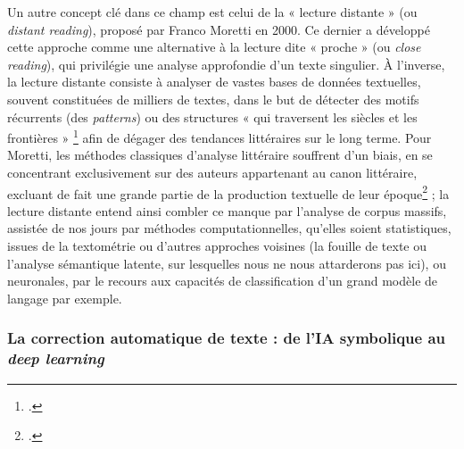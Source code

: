 Un autre concept clé dans ce champ est celui de la « lecture distante » (ou \textit{distant reading}), proposé par Franco Moretti en 2000. Ce dernier a développé cette approche comme une alternative à la lecture dite « proche » (ou \textit{close reading}), qui privilégie une analyse approfondie d'un texte singulier. À l'inverse, la lecture distante consiste à analyser de vastes bases de données textuelles, souvent constituées de milliers de textes, dans le but de détecter des motifs récurrents (des \textit{patterns}) ou des structures « qui traversent les siècles et les frontières » \footcite{puren_intelligence_2020} afin de dégager des tendances littéraires sur le long terme. Pour Moretti, les méthodes classiques d'analyse littéraire souffrent d'un biais, en se concentrant exclusivement sur des auteurs appartenant au canon littéraire, excluant de fait une grande partie de la production textuelle de leur époque\footcite[paragraphe 12]{mounier_ce_2018} ; la lecture distante entend ainsi combler ce manque par l’analyse de corpus massifs, assistée de nos jours par méthodes computationnelles, qu’elles soient statistiques, issues de la textométrie ou d’autres approches voisines (la fouille de texte ou l’analyse sémantique latente, sur lesquelles nous ne nous attarderons pas ici), ou neuronales, par le recours aux capacités de classification d’un grand modèle de langage par exemple.

\subsubsection{La correction automatique de texte : de l’IA symbolique au \textit{deep learning}}

